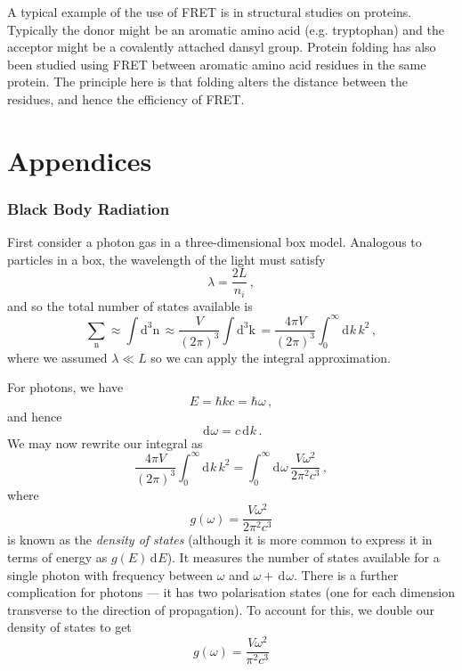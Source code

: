 \documentclass{article}
\theoremstyle{plain}\theoremheaderfont{\normalfont\itshape}\theorembodyfont{\rmfamily}\theoremseparator{.}\newtheorem*{rem}{Remark}\newtheorem*{ex}{Example}\newtheorem*{proof}{Proof}\newtheorem*{altp}{Alternative proof}
\theoremstyle{plain}\theoremheaderfont{\normalfont\bfseries}\theorembodyfont{\rmfamily}\theoremseparator{.}\newtheorem{thm}{Theorem}[section]\newtheorem{lem}[thm]{Lemma}\newtheorem{prop}[thm]{Proposition}\newtheorem*{cor}{Corollary}\newtheorem{defn}[thm]{Definition}\newtheorem{clm}[thm]{Claim}\newtheorem{clminproof}{Claim}\newtheorem{pos}{Postulate}[section]
\theoremstyle{break}\theoremheaderfont{\normalfont\itshape}\theorembodyfont{\rmfamily}\theoremseparator{.\medskip}\newtheorem*{proofskip}{Proof}\newtheorem*{exs}{Examples}\newtheorem*{rems}{Remarks}
\theoremstyle{break}\theoremheaderfont{\normalfont\bfseries}\theorembodyfont{\rmfamily}\theoremseparator{.\medskip}\newtheorem{lemskip}[thm]{Lemma}\newtheorem{defnskip}[thm]{Definition}\newtheorem{propskip}[thm]{Proposition}\newtheorem{thmskip}[thm]{Theorem}
\numberwithin{equation}{section}
\newcommand{\dd}[2][]{\mathrm{d}^{#1} #2\,}
\renewcommand{\d}[2][]{\,\mathrm{d}^{#1} #2}
\newcommand{\vb}[1]{\bm{\mathrm{#1}}}
\begin{document}
    A typical example of the use of FRET is in structural studies on proteins. Typically the donor might be an aromatic amino acid (e.g. tryptophan) and the acceptor might be a covalently attached dansyl group. Protein folding has also been studied using FRET between aromatic amino acid residues in the same protein. The principle here is that folding alters the distance between the residues, and hence the efficiency of FRET.
    

    \newpage
    \part*{Appendices}
    \appendix
    
    \section{Black Body Radiation}\label{Chap:Black_Body}
    First consider a photon gas in a three-dimensional box model. Analogous to particles in a box, the wavelength of the light must satisfy
    \begin{equation}
        \lambda=\frac{2L}{n_i}\,,
    \end{equation}
    and so the total number of states available is
    \begin{equation}
        \sum_{\vb{n}}\approx\int\dd[3]{\vb{n}}\approx\frac{V}{(2\pi)^3}\int\dd[3]{\vb{k}}=\frac{4\pi V}{(2\pi)^3}\int_{0}^{\infty}\dd{k}k^2\,,
    \end{equation}
    where we assumed \(\lambda\ll L\) so we can apply the integral approximation.
    
    For photons, we have
    \begin{equation}
        E=\hbar kc=\hbar\omega\,,
    \end{equation}
    and hence
    \begin{equation}
        \d{\omega}=c\d{k}\,.
    \end{equation}
    We may now rewrite our integral as
    \begin{equation}
        \frac{4\pi V}{(2\pi)^3}\int_{0}^{\infty}\dd{k}k^2=\int_0^\infty\dd{\omega}\frac{V\omega^2}{2\pi^2c^3}\,,
    \end{equation}
    where
    \begin{equation}
        g(\omega)=\frac{V\omega^2}{2\pi^2c^3}
    \end{equation}
    is known as the \textit{density of states} (although it is more common to express it in terms of energy as \(g(E)\d{E}\)). It measures the number of states available for a single photon with frequency between \(\omega\) and \(\omega+\d{\omega}\). There is a further complication for photons --- it has two polarisation states (one for each dimension transverse to the direction of propagation). To account for this, we double our density of states to get
    \begin{equation}\label{photon_densit_of_states}
        g(\omega)=\frac{V\omega^2}{\pi^2c^3}
    \end{equation}
\end{document}
